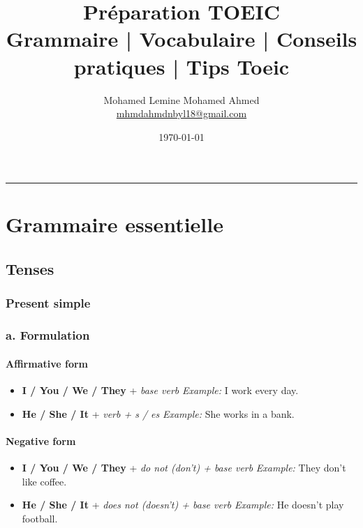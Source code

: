 \documentclass[11pt,a4paper]{article}
\title{\vspace{-1.5em}\textbf{Préparation TOEIC}\\
\large Grammaire \;|\; Vocabulaire \;|\; Conseils pratiques \;|\; Tips Toeic}
\author{%
Mohamed Lemine Mohamed Ahmed \\
\small \href{mailto:prenom.nom@email.com}{mhmdahmdnbyl18@gmail.com}
}
\date{\small \today}
\begin{document}
\maketitle
\vspace{-1em}
\hrule
\vspace{0.8em}

\tableofcontents
\newpage


\section{Grammaire essentielle}

\subsection{Tenses}

\subsubsection{Present simple}


\subsubsection*{a. Formulation}

\paragraph{Affirmative form}
\begin{itemize}
  \item \textbf{I / You / We / They} + \textit{base verb}  
  \textit{Example:} I work every day.
  \item \textbf{He / She / It} + \textit{verb + s / es}  
  \textit{Example:} She works in a bank.
\end{itemize}

\paragraph{Negative form}
\begin{itemize}
  \item \textbf{I / You / We / They} + \textit{do not (don’t) + base verb}  
  \textit{Example:} They don’t like coffee.
  \item \textbf{He / She / It} + \textit{does not (doesn’t) + base verb}  
  \textit{Example:} He doesn’t play football.
\end{itemize}
\end{document}
